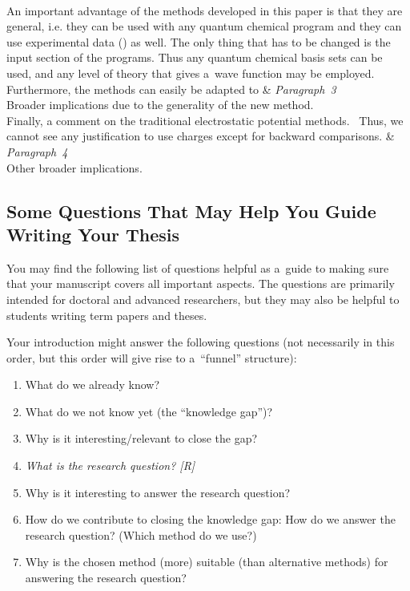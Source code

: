 \documentclass[12pt, a4paper, oneside]{article}
\newlength{\smalllinespacing}
\renewcommand{\caps}[1]{{\textscale{0.97}{\textls[50]{\MakeUppercase{#1}}}}}
\theoremstyle{Plain}
\theoremstyle{Definition}
\theoremstyle{Remark}
\begin{document}
\begin{tcolorbox}
\begin{tblr}{}
{		}
		\\
		\hspace{\smalllinespacing}An important advantage of the methods developed in this paper is that they are general, i.e. they can be used with any quantum chemical program and they can use experimental data (\textellipsis\!) as well. The only thing that has to be changed is the input section of the programs. Thus any quantum chemical basis sets can be used, and any level of theory that gives a~wave function may be employed. Furthermore, the methods can easily be adapted to \textellipsis
		&
		{%
			\textit{Paragraph~3} \\
			Broader implications due to the generality of the new method.
		}
		\\
		\hspace{\smalllinespacing}Finally, a comment on the traditional electrostatic potential methods. \textellipsis\ Thus, we cannot see any justification to use \caps{CHELP} charges except for backward comparisons.
		&
		{%
			\textit{Paragraph~4} \\
			Other broader implications.
		}
	\end{tblr}
\end{tcolorbox}

\endgroup

\subsection{Some Questions That May Help You Guide Writing Your Thesis}

You may find the following list of questions helpful as a~guide to making sure that your manu\-script covers all important aspects. The questions are primarily intended for doctoral and advanced researchers, but they may also be helpful to students writing term papers and theses.

Your introduction might answer the following questions (not necessarily in this order, but this order will give rise to a~``funnel'' structure):
\begin{enumerate}[labelindent = \parindent, leftmargin = 2\parindent]
	\item What do we already know?
	\item What do we not know yet (the ``knowledge gap'')?
	\item Why is it interesting\slash relevant to close the gap?
	\item \emph{What is the research question? [R]}
	\item Why is it interesting to answer the research question?
	\item How do we contribute to closing the knowledge gap: How do we answer the research question? (Which method do we use?)
	\item Why is the chosen method (more) suitable (than alternative methods) for answering the research question?
\end{enumerate}
\end{document}
